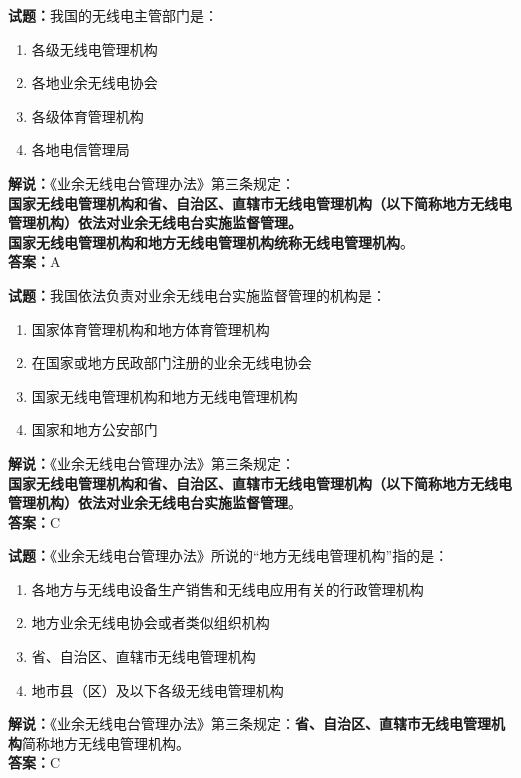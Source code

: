 \documentclass{ctexbook}
\begin{document}
\bigskip


\noindent\textbf{试题：}我国的无线电主管部门是：
\begin{enumerate}[leftmargin=3em]
\item 各级无线电管理机构
\item 各地业余无线电协会
\item 各级体育管理机构
\item 各地电信管理局
\end{enumerate}
\noindent\textbf{解说：}《业余无线电台管理办法》第三条规定：\\\textbf{国家无线电管理机构和省、自治区、直辖市无线电管理机构（以下简称地方无线电管理机构）依法对业余无线电台实施监督管理。\\
国家无线电管理机构和地方无线电管理机构统称无线电管理机构}。\\\noindent\textbf{答案：}A

\bigskip


\noindent\textbf{试题：}我国依法负责对业余无线电台实施监督管理的机构是：
\begin{enumerate}[leftmargin=3em]
\item 国家体育管理机构和地方体育管理机构
\item 在国家或地方民政部门注册的业余无线电协会
\item 国家无线电管理机构和地方无线电管理机构
\item 国家和地方公安部门
\end{enumerate}
\noindent\textbf{解说：}《业余无线电台管理办法》第三条规定：\\\textbf{国家无线电管理机构和省、自治区、直辖市无线电管理机构（以下简称地方无线电管理机构）依法对业余无线电台实施监督管理}。\\\noindent\textbf{答案：}C

\bigskip


\noindent\textbf{试题：}《业余无线电台管理办法》所说的“地方无线电管理机构”指的是：
\begin{enumerate}[leftmargin=3em]
\item 各地方与无线电设备生产销售和无线电应用有关的行政管理机构
\item 地方业余无线电协会或者类似组织机构
\item 省、自治区、直辖市无线电管理机构
\item 地市县（区）及以下各级无线电管理机构
\end{enumerate}
\noindent\textbf{解说：}《业余无线电台管理办法》第三条规定：\textbf{省、自治区、直辖市无线电管理机构}简称地方无线电管理机构。\\\noindent\textbf{答案：}C
\end{document}
